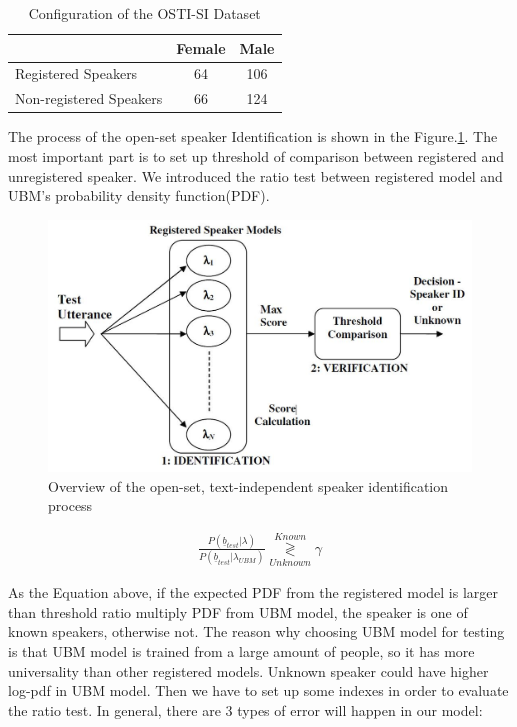 \documentclass[12pt,DIV14,BCOR12mm,a4paper,footinclude=false,headinclude,parskip=half-,twoside,openright,cleardoublepage=empty,toc=index,bibliography=totoc,listof=totoc]{scrreprt}
\numberwithin{equation}{chapter}
\begin{document}
\begin{table}
	\centering
	\caption{Configuration of the OSTI-SI Dataset}
	\label{enh_data}
	\begin{tabular}{lcc}
		\toprule
		& Female & Male  \\
		\midrule
		Registered Speakers & 64 & 106 \\
		Non-registered Speakers & 66 & 124 \\
		\bottomrule
	\end{tabular}
\end{table}

The process of the open-set speaker Identification is shown in the Figure.\ref{OSIE}. The most important part is to set up threshold of comparison between registered and unregistered speaker. We introduced the ratio test between registered model and UBM's probability density function(PDF).

\begin{figure}
	\centering
	\includegraphics[scale=0.6]{image/ProcessOSIE}
	\caption{Overview of the open-set, text-independent speaker identification process}
	\label{OSIE}
\end{figure}

\begin{align}
\frac{P(\underline{b}_{test}|\lambda)}{P(\underline{b}_{test}|\lambda_{UBM})}\underset{Unknown}{\overset{Known}{\gtrless}}\gamma
\end{align}

As the Equation above, if the expected PDF from the registered model is larger than threshold ratio multiply PDF from UBM model, the speaker is one of known speakers, otherwise not. The reason why choosing UBM model for testing is that UBM model is trained from a large amount of people, so it has more universality than other registered models. Unknown speaker could have higher log-pdf in UBM model. Then we have to set up some indexes in order to evaluate the ratio test. In general, there are 3 types of error will happen in our model:
\end{document}
